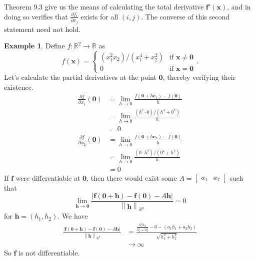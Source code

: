 \documentclass{article}
\newcommand{\R}{\mathbb{R}}
\newcommand{\x}{\mathbf{x}}
\newcommand{\f}{\mathbf{f}}
\newcommand{\ze}{\mathbf{0}}
\newcommand{\norm}[1]{\left\lVert#1\right\rVert}
\theoremstyle{definition}
\newtheorem{example}{Example}[section]
\begin{document}
	Theorem 9.3 give us the means of calculating the total derivative $ \f'(\x) $, and in doing so verifies that $ \frac{\partial f_i}{\partial x_j} $ exists for all $ (i,j) $. The converse of this second statement need not hold. 
	\begin{example}
		Define $ f:\R^2\to\R $ as 
		$$f(\x)= \begin{cases}
			(x_1^2x_2)/(x_1^4+x_2^2) & \text{if }\x\neq\ze\\ 
			0 & \text{if }\x=\ze
		\end{cases}.$$
		Let's calculate the partial derivatives at the point $ \ze $, thereby verifying their existence. 
		\begin{align*}
			\frac{\partial f}{\partial x_1}(\ze) &= \lim\limits_{h\to 0}\frac{f( \ze + h\mathbf e_1 )-f(\ze)}{h} \\
			&= \lim\limits_{h\to 0}\frac{(h^2\cdot 0)/(h^4+0^2)}{h}\\ & = 0 \\
			\frac{\partial f}{\partial x_2}(\ze) &= \lim\limits_{h\to 0}\frac{f( \ze + h\mathbf e_2 )-f(\ze)}{h} \\
			&= \lim\limits_{h\to 0}\frac{(0\cdot h^2)/(0^4+h^2)}{h}\\ & = 0 
		\end{align*}
		If $ \f $ were differentiable at $ \ze $, then there would exist some $ A=\begin{bmatrix}
			a_1 & a_2
		\end{bmatrix} $ such that 
		$$\lim\limits_{\mathbf h\to \ze}\frac{|{\f(\ze +\mathbf h) - \f(\ze)-A\mathbf{h}}|}{\norm{\mathbf h}_{\R^n}} = 0$$ for $ \mathbf h = (h_1,h_2) $. 
		We have \begin{align*}
			\frac{|{\f(\ze +\mathbf h) - \f(\ze)-A\mathbf{h}}|}{\norm{\mathbf h}_{\R^n}}& = \frac{\frac{h_1^2h_2}{h_1^4+h_2^2} - 0 - (a_1h_1 +a_2h_2) }{\sqrt{h_1^2 + h_2^2}}\\ & \to \infty
		\end{align*}
		So $ \f $ is not differentiable. 
	\end{example}
	
\end{document}
